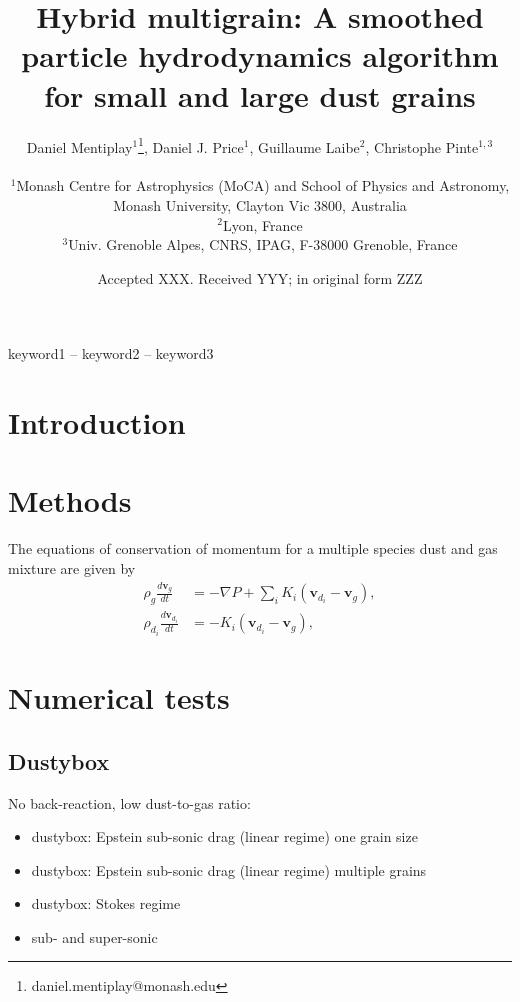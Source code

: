 \documentclass[fleqn,usenatbib]{mnras}
\title[Hybrid multigrain]{Hybrid multigrain: A smoothed particle hydrodynamics
algorithm for small and large dust grains}
\author[Mentiplay, Price, Laibe, \& Pinte]{%
   \parbox{\textwidth}{%
      Daniel Mentiplay$^{1}$\thanks{daniel.mentiplay@monash.edu},
      Daniel J. Price$^{1}$,
      Guillaume Laibe$^{2}$,
      Christophe Pinte$^{1,3}$}\\
   $^{1}$Monash Centre for Astrophysics (MoCA) and School of Physics and
   Astronomy, Monash University, Clayton Vic 3800, Australia \\
   $^{2}$Lyon, France \\
   $^{3}$Univ. Grenoble Alpes, CNRS, IPAG, F-38000 Grenoble, France}
\date{Accepted XXX. Received YYY; in original form ZZZ}
\let\vec\mathbf
\begin{document}
\label{firstpage}
\pagerange{\pageref{firstpage}--\pageref{lastpage}}
\maketitle

\begin{abstract}
\end{abstract}

\begin{keywords}
keyword1 -- keyword2 -- keyword3
\end{keywords}



\section{Introduction}

\section{Methods}

The equations of conservation of momentum for a multiple species dust and gas
mixture are given by
%
\begin{align}
   \rho_g \frac{d \vec{v}_g}{dt} &= - \nabla P + \sum_i K_i \left(\vec{v}_{d_i}
                                    - \vec{v}_{g}\right), \\
   \rho_{d_i} \frac{d \vec{v}_{d_i}}{dt} &= - K_i \left(\vec{v}_{d_i}
                                                       - \vec{v}_{g}\right),
\end{align}
%



\section{Numerical tests}

\subsection{Dustybox}

No back-reaction, low dust-to-gas ratio:

\begin{itemize}

   \item dustybox: Epstein sub-sonic drag (linear regime) one grain size
   \item dustybox: Epstein sub-sonic drag (linear regime) multiple grains
   \item dustybox: Stokes regime
   \item sub- and super-sonic
\end{itemize}
\end{document}
